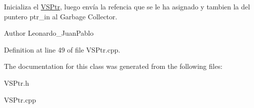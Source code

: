 Inicializa el \hyperlink{class_v_s_ptr}{V\+S\+Ptr}, luego envía la refencia que se le ha asignado y tambien la del puntero ptr\+\_\+in al Garbage Collector. 

\begin{DoxyAuthor}{Author}
Leonardo\+\_\+\+Juan\+Pablo 
\end{DoxyAuthor}


Definition at line 49 of file V\+S\+Ptr.\+cpp.



The documentation for this class was generated from the following files\+:\begin{DoxyCompactItemize}
\item 
V\+S\+Ptr.\+h\item 
V\+S\+Ptr.\+cpp\end{DoxyCompactItemize}
